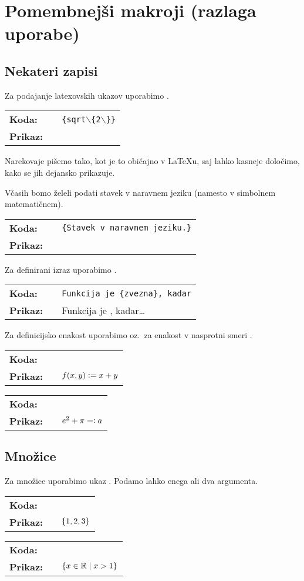 \chapter{Pomembnejši makroji (razlaga uporabe)}


\newcommand{\ponazoritev}[2]{

\medskip
\begin{tabular}{lll}
\textbf{Koda:} && \texttt{#1} \\[1ex]
\textbf{Prikaz:} && {#2}
\end{tabular}
\bigskip

}

\section*{Nekateri zapisi}

Za podajanje latexovskih ukazov uporabimo . 
\ponazoritev{\ltc{ltc}\{sqrt$\backslash$\{2$\backslash$\}\}}{\ltc{sqrt\{2\}}}

Narekovaje pišemo tako, kot je to običajno v {\LaTeX}u, saj lahko kasneje določimo, kako
se jih dejansko prikazuje.

Včasih bomo želeli podati stavek v naravnem jeziku (namesto v simbolnem matematičnem).
\ponazoritev{\ltc{nls}\{Stavek v naravnem jeziku.\}}{\nls{Stavek v naravnem jeziku.}}

Za definirani izraz uporabimo .
\ponazoritev{Funkcija je \ltc{df}\{zvezna\}, kadar\ltc{ldots}}{Funkcija je \df{zvezna}, kadar\ldots}

Za definicijsko enakost uporabimo  oz.~za enakost v nasprotni smeri .
\ponazoritev{\textdollar{f(x,y) \ltc{dfeq} x + y}\textdollar}{$f(x,y) \mathrel{\mathop:}= x + y$}
\ponazoritev{\textdollar{e\^{}2 + \ltc{pi} \ltc{revdfeq} a}\textdollar}{$e^2 + \pi =\mathrel{\mathop:} a$}

\section*{Množice}

Za množice uporabimo ukaz . Podamo lahko enega ali dva argumenta.
\ponazoritev{\textdollar{\ltc{set}\{1,2,3\}}\textdollar}{$\set{1,2,3}$}
\ponazoritev{\textdollar{\ltc{set}\{x \ltc{in} \ltc{RR}\}\{x > 1\}}\textdollar}{$\set{x \in \RR}{x > 1}$}

